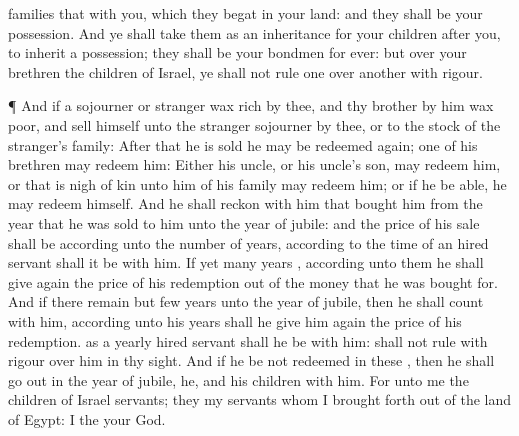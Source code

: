 {families that
{} with you, which they
begat in your
land: and they shall be your
possession.
And ye shall take them as an
inheritance for your
children
after you, to
inherit
{} a
possession; they shall be your
bondmen for
ever: but over your
brethren the
children of
Israel, ye shall not
rule
one over
another with
rigour.
\par }{\PP {}¶ And if a
sojourner or
stranger wax
rich by
thee, and thy
brother
{} by him wax
poor, and
sell himself unto the
stranger
{}
sojourner by thee, or to the
stock of the
stranger’s
family:
After that he is
sold he may be redeemed
again;
one of his
brethren may
redeem him:
Either his
uncle, or his
uncle’s
son, may
redeem him, or
{} that is
nigh of
kin unto him of his
family may
redeem him; or if he be
able, he may
redeem
himself.
And he shall
reckon with him that
bought him from the
year that he was
sold to him unto the
year of
jubile: and the
price of his
sale shall be according unto the
number of
years, according to the
time of an hired
servant shall it be with him.
If
{} yet
many
years
{},
according unto them he shall give
again the price of his
redemption out of the
money that he was
bought for.
And if there
remain but
few
years unto the
year of
jubile, then he shall
count with him,
{}
according unto his
years shall he give him
again the price of his
redemption.
 as a
yearly hired
servant shall he be with him:
{} shall not
rule with
rigour over him in thy
sight.
And if he be not
redeemed in these
{}, then he shall go
out in the
year of
jubile,
{} he, and his
children with him.
For unto me the
children of
Israel
{}
servants; they
{} my
servants whom I brought
forth out of the
land of
Egypt: I
{} the
{} your
God.

}
